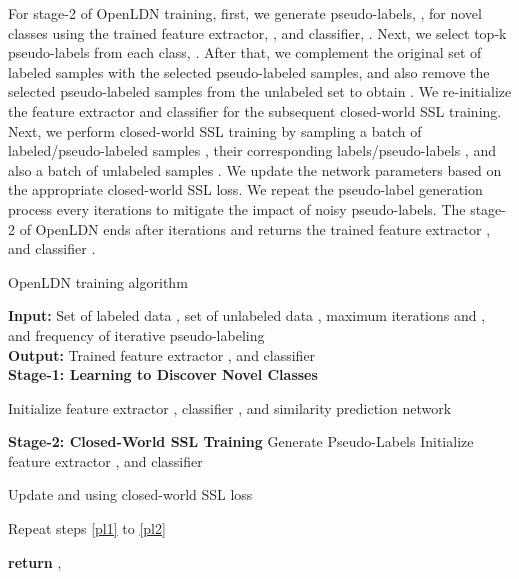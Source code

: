 \documentclass[runningheads]{eccv2022submission}
\begin{document}
For stage-2 of OpenLDN training, first, we generate pseudo-labels, , for novel classes using the trained feature extractor, , and classifier, . Next, we select top-k pseudo-labels from each class, . After that, we complement the original set of labeled samples with the selected pseudo-labeled samples,  and also remove the selected pseudo-labeled samples from the unlabeled set to obtain . We re-initialize the feature extractor and classifier for the subsequent closed-world SSL training. Next, we perform closed-world SSL training by sampling a batch of labeled/pseudo-labeled samples , their corresponding labels/pseudo-labels , and also a batch of unlabeled samples . We update the network parameters based on the appropriate closed-world SSL loss. We repeat the pseudo-label generation process every  iterations to mitigate the impact of noisy pseudo-labels. The stage-2 of OpenLDN ends after  iterations and returns the trained feature extractor , and classifier .                 
\begin{algorithm}[h]
\caption{OpenLDN training algorithm}
\label{alg: alogirthm1}
\textbf{Input:} Set of labeled data , set of unlabeled data , maximum iterations  and , and frequency of iterative pseudo-labeling  \\
\textbf{Output:} Trained feature extractor , and classifier  \\

\textbf{\hskip 5.7mm Stage-1: Learning to Discover Novel Classes}
\begin{algorithmic}[1]
\State Initialize feature extractor , classifier , and similarity prediction network 
  \State 
  \State  
  \State  {}
  \State 
  \State 
  \State 
 
\EndFor


\noindent
\textbf{Stage-2: Closed-World SSL Training}
\State  Generate Pseudo-Labels  \label{pl1}
\State  {}
\State 
\State  \label{pl2}
\State Initialize feature extractor , and classifier 



  \State 
  \State 
\State Update  and  using closed-world SSL loss
  
 \If {}
    \State Repeat steps \ref{pl1} to \ref{pl2}
\EndIf
 \EndFor

\State \textbf{return} , 


\end{algorithmic}
\end{algorithm}
\end{document}
